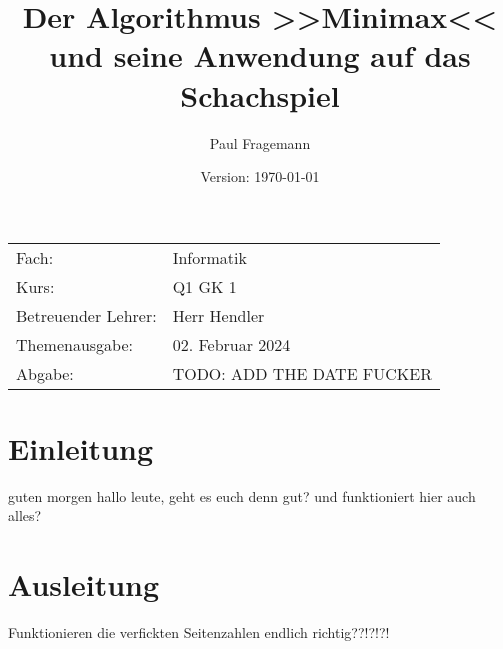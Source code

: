 \documentclass[11pt, a4paper, oneside, openright]{article}
\title{Der Algorithmus >>Minimax<< und seine Anwendung auf das Schachspiel}
\author{Paul Fragemann}
\date{Version: \today}
\begin{document}
\maketitle
\thispagestyle{empty}

\vfill

\noindent
\begin{tabular}{p{4cm}l}
    Fach:                   & Informatik \tabularnewline
    Kurs:                   & Q1 GK 1 \tabularnewline
    Betreuender Lehrer:     & Herr Hendler \tabularnewline
    Themenausgabe:          & 02. Februar 2024 \tabularnewline
    Abgabe:                 & TODO: ADD THE DATE FUCKER \tabularnewline
\end{tabular}





\newpage

\thispagestyle{empty}
\tableofcontents



\newpage
\setcounter{page}{3}
\section{Einleitung}
guten morgen hallo leute, geht es euch denn gut?  und funktioniert hier auch alles?

\newpage
\section{Ausleitung}
Funktionieren die verfickten Seitenzahlen endlich richtig??!?!?!
\end{document}
